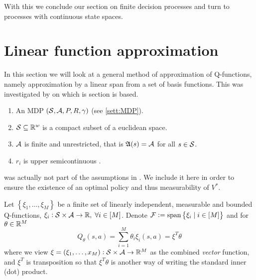 With this we conclude our section on finite decision processes and turn
to processes with continuous state spaces.

\section{Linear function approximation} \label{sec:linearFunctionApprox}

In this section we will look at a general method of approximation of
Q-functions,
namely approximation by a linear span from a set of basis functions.
This was investigated by  on which is section is based.

\begin{sett}
  \leavevmode
  \begin{enumerate}
    \item An MDP $(\mathcal{S}, \mathcal{A}, P, R, \gamma)$ (see \cref{sett:MDP}).
    \item $\mathcal{S} \subseteq \mathbb{R}^w$ is a compact subset of a euclidean space.
    \item $\mathcal{A}$ is finite and unrestricted, that
      is $\frak{A}(s) = \mathcal{A}$ for all 
      $s \in \mathcal{S}$.
    \item $r_i$ is upper semicontinuous \label{item:MRlast}.
  \end{enumerate}
  \label{sett:MR}
\end{sett}

\begin{rem}
   was actually not part of the assumptions in
  .
  We include it here in order to ensure the existence of an
  optimal policy and thus measurability of $V^*$.
\end{rem}

Let $\left\{ \xi_1, \dots, \xi_M \right\}$ be a finite set of linearly
independent, measurable and bounded Q-functions,
$\xi_i : \mathcal{S} \times \mathcal{A} \to \mathbb{R},\; \forall i \in [M]$.
Denote $\mathcal{F} \vcentcolon= \mathrm{span}\left\{ \xi_i \mid i \in [M] \right\}$
and for $\theta \in \mathbb{R}^M$
\begin{equation}
  Q_\theta(s, a) = \sum_{i=1}^M \theta_i \xi_i(s, a) = \xi^T \theta
  \label{eq:QthetaLinApprox}
\end{equation}
where we view $\xi = (\xi_1, \dots, x_M) : \mathcal{S} \times \mathcal{A} \to \mathbb{R}^M$
as the combined \emph{vector} function, and $\xi^T$ is transposition
so that $\xi^T \theta$ is another way of writing the standard inner (dot)
product.

